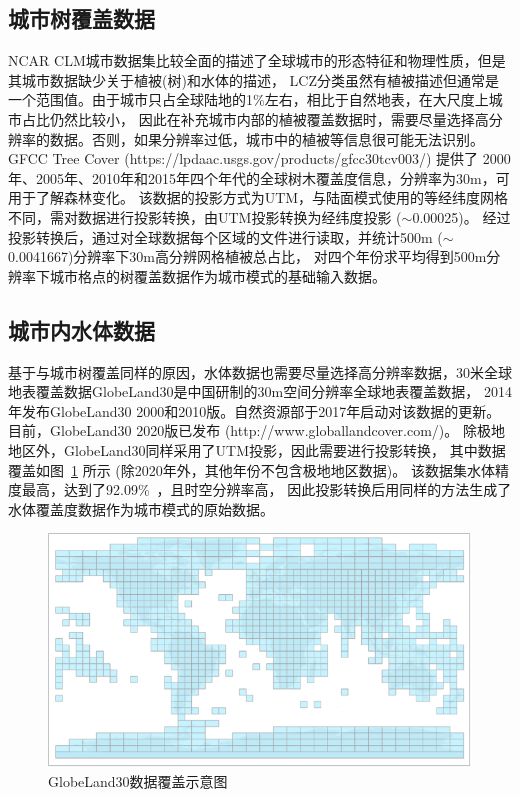 \subsection{城市树覆盖数据}\label{城市树覆盖数据}
NCAR CLM城市数据集比较全面的描述了全球城市的形态特征和物理性质，但是其城市数据缺少关于植被(树)和水体的描述，
LCZ分类虽然有植被描述但通常是一个范围值。由于城市只占全球陆地的1\%左右，相比于自然地表，在大尺度上城市占比仍然比较小，
因此在补充城市内部的植被覆盖数据时，需要尽量选择高分辨率的数据。否则，如果分辨率过低，城市中的植被等信息很可能无法识别。
GFCC Tree Cover (https://lpdaac.usgs.gov/products/gfcc30tcv003/) 提供了
2000年、2005年、2010年和2015年四个年代的全球树木覆盖度信息，分辨率为30m，可用于了解森林变化。
该数据的投影方式为UTM，与陆面模式使用的等经纬度网格不同，需对数据进行投影转换，由UTM投影转换为经纬度投影 ($\sim$0.00025\textdegree)。
经过投影转换后，通过对全球数据每个区域的文件进行读取，并统计500m ($\sim$0.0041667\textdegree)分辨率下30m高分辨网格植被总占比，
对四个年份求平均得到500m分辨率下城市格点的树覆盖数据作为城市模式的基础输入数据。

\subsection{城市内水体数据}\label{城市内水体数据}
基于与城市树覆盖同样的原因，水体数据也需要尽量选择高分辨率数据，30米全球地表覆盖数据GlobeLand30是中国研制的30m空间分辨率全球地表覆盖数据，
2014年发布GlobeLand30 2000和2010版。自然资源部于2017年启动对该数据的更新。目前，GlobeLand30 2020版已发布 (http://www.globallandcover.com/)。
除极地地区外，GlobeLand30同样采用了UTM投影，因此需要进行投影转换，
其中数据覆盖如图~\ref{fig:GlobeLand30数据覆盖示意图} 所示 (除2020年外，其他年份不包含极地地区数据)。
该数据集水体精度最高，达到了92.09\%~\citep{陈军2017}，且时空分辨率高，
因此投影转换后用同样的方法生成了水体覆盖度数据作为城市模式的原始数据。
{
\begin{figure}[]
\centering
\includegraphics{Figures/地表输入数据/GlobeLand30数据覆盖示意图.png}
\caption{GlobeLand30数据覆盖示意图}
\label{fig:GlobeLand30数据覆盖示意图}
\end{figure}
}

